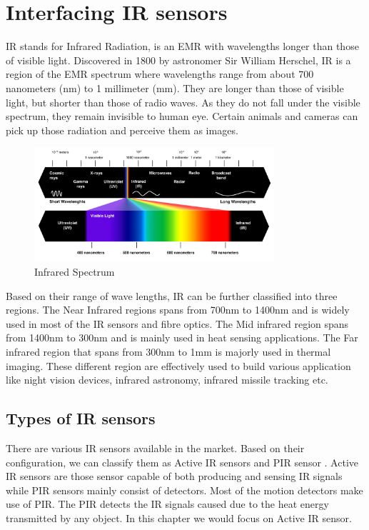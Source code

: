 \chapter{Interfacing IR sensors}
\label{ch:ir-sensors}

\ac{IR} stands for Infrared Radiation, is an \ac{EMR} with wavelengths longer than those of visible light. Discovered in 1800 by astronomer Sir William Herschel, \ac{IR} is a region of the \ac{EMR} spectrum where wavelengths range from about 700 nanometers (nm) to 1 millimeter (mm). They are longer than those of visible light, but shorter than those of radio waves. As they do not fall under the visible spectrum, they remain invisible to human eye. Certain animals and cameras can pick up those radiation and perceive them as images.

\begin{figure}
    \centering
	\includegraphics[width=3.5in]{Images/IR Sensor/IR_spectrum.jpg}
	\caption{Infrared Spectrum}
\end{figure}

Based on their range of wave lengths, \ac{IR} can be further classified into three regions. The Near Infrared regions spans from 700nm to 1400nm and is widely used in most of the \ac{IR} sensors and fibre optics. The Mid infrared region spans from 1400nm to 300nm and is mainly used in heat sensing applications. The Far infrared region that spans from 300nm to 1mm is majorly used in thermal imaging. These different region are effectively used to build various application like night vision devices, infrared astronomy, infrared missile tracking etc.


\section{Types of \ac{IR} sensors}
\par There are various \ac{IR} sensors available in the market. Based on their configuration, we can classify them as Active \ac{IR} sensors and \ac{PIR} sensor . Active \ac{IR} sensors are those sensor capable of both producing and sensing \ac{IR} signals while \ac{PIR} sensors mainly consist of detectors. Most of the motion detectors make use of \ac{PIR}. The \ac{PIR} detects the \ac{IR} signals caused due to the heat energy transmitted by any object. In this chapter we would focus on Active \ac{IR} sensor.

